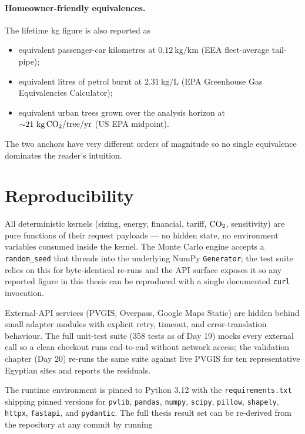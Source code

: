 \paragraph{Homeowner-friendly equivalences.}
The lifetime kg figure is also reported as
\begin{itemize}[leftmargin=*]
\item equivalent passenger-car kilometres at $0.12~\mathrm{kg/km}$
(EEA fleet-average tail-pipe);
\item equivalent litres of petrol burnt at $2.31~\mathrm{kg/L}$
(EPA Greenhouse Gas Equivalencies Calculator);
\item equivalent urban trees grown over the analysis horizon at
${\sim}21~\mathrm{kg\,\mathrm{CO_{2}}/tree/yr}$ (US EPA midpoint).
\end{itemize}
The two anchors have very different orders of magnitude so no single
equivalence dominates the reader's intuition.

\section{Reproducibility}

All deterministic kernels (sizing, energy, financial, tariff,
$\mathrm{CO_{2}}$, sensitivity) are pure functions of their request payloads
--- no hidden state, no environment variables consumed inside the
kernel. The Monte Carlo engine accepts a \texttt{random\_seed} that
threads into the underlying NumPy \texttt{Generator}; the test suite
relies on this for byte-identical re-runs and the API surface
exposes it so any reported figure in this thesis can be reproduced
with a single documented \texttt{curl} invocation.

External-API services (PVGIS, Overpass, Google Maps Static) are
hidden behind small adapter modules with explicit retry, timeout,
and error-translation behaviour. The full unit-test suite (358
tests as of Day 19) mocks every external call so a clean checkout
runs end-to-end without network access; the validation chapter
(Day 20) re-runs the same suite against live PVGIS for ten
representative Egyptian sites and reports the residuals.

The runtime environment is pinned to Python 3.12 with the
\texttt{requirements.txt} shipping pinned versions for
\texttt{pvlib}, \texttt{pandas}, \texttt{numpy}, \texttt{scipy},
\texttt{pillow}, \texttt{shapely}, \texttt{httpx}, \texttt{fastapi},
and \texttt{pydantic}. The full thesis result set can be re-derived
from the repository at any commit by running

